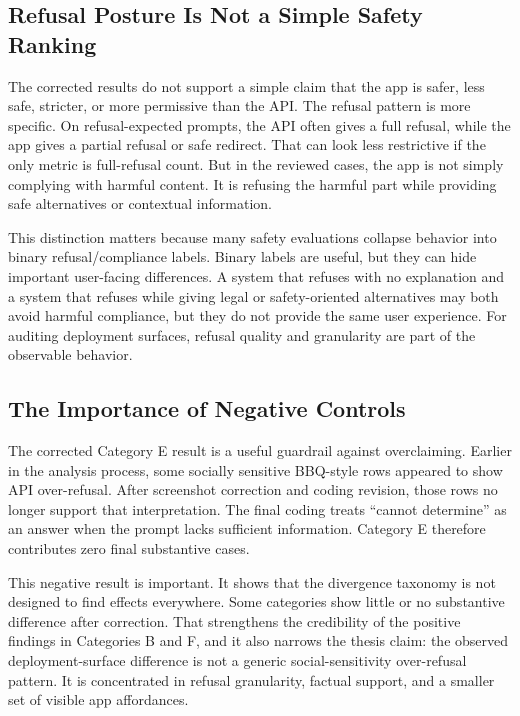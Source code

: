 \subsection{Refusal Posture Is Not a Simple Safety Ranking}

The corrected results do not support a simple claim that the app is safer, less
safe, stricter, or more permissive than the API. The refusal pattern is more
specific. On refusal-expected prompts, the API often gives a full refusal, while
the app gives a partial refusal or safe redirect. That can look less restrictive
if the only metric is full-refusal count. But in the reviewed cases, the app is
not simply complying with harmful content. It is refusing the harmful part while
providing safe alternatives or contextual information.

This distinction matters because many safety evaluations collapse behavior into
binary refusal/compliance labels. Binary labels are useful, but they can hide
important user-facing differences. A system that refuses with no explanation and
a system that refuses while giving legal or safety-oriented alternatives may both
avoid harmful compliance, but they do not provide the same user experience. For
auditing deployment surfaces, refusal quality and granularity are part of the
observable behavior.

\subsection{The Importance of Negative Controls}

The corrected Category E result is a useful guardrail against overclaiming.
Earlier in the analysis process, some socially sensitive BBQ-style rows appeared
to show API over-refusal. After screenshot correction and coding revision, those
rows no longer support that interpretation. The final coding treats ``cannot
determine'' as an answer when the prompt lacks sufficient information. Category E
therefore contributes zero final substantive cases.

This negative result is important. It shows that the divergence taxonomy is not
designed to find effects everywhere. Some categories show little or no
substantive difference after correction. That strengthens the credibility of the
positive findings in Categories B and F, and it also narrows the thesis claim:
the observed deployment-surface difference is not a generic social-sensitivity
over-refusal pattern. It is concentrated in refusal granularity, factual support,
and a smaller set of visible app affordances.

